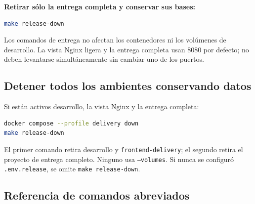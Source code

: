 \documentclass[11pt,letterpaper]{article}
\newcommand{\file}[1]{\texttt{#1}}
\begin{document}
\textbf{Retirar sólo la entrega completa y conservar sus bases:}

\begin{lstlisting}[style=terminal,language=bash]
make release-down
\end{lstlisting}

Los comandos de entrega no afectan los contenedores ni los volúmenes de desarrollo. La vista Nginx ligera y la entrega completa usan 8080 por defecto; no deben levantarse simultáneamente sin cambiar uno de los puertos.

\subsection{Detener todos los ambientes conservando datos}

Si están activos desarrollo, la vista Nginx y la entrega completa:

\begin{lstlisting}[style=terminal,language=bash]
docker compose --profile delivery down
make release-down
\end{lstlisting}

El primer comando retira desarrollo y \file{frontend-delivery}; el segundo retira el proyecto de entrega completo. Ninguno usa \file{--volumes}. Si nunca se configuró \file{.env.release}, se omite \file{make release-down}.

\subsection{Referencia de comandos abreviados}
\end{document}
